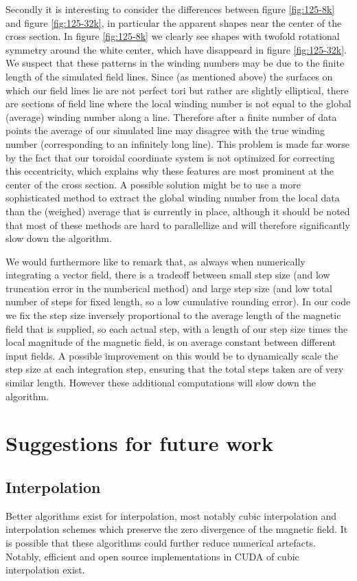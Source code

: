 \documentclass{article}
\begin{document}
Secondly it is interesting to consider the differences between figure \ref{fig:125-8k} and figure \ref{fig:125-32k}, in particular the apparent shapes near the center of the cross section. In figure \ref{fig:125-8k} we clearly see shapes with twofold rotational symmetry around the white center, which have disappeard in figure \ref{fig:125-32k}. We suspect that these patterns in the winding numbers may be due to the finite length of the simulated field lines. Since (as mentioned above) the surfaces on which our field lines lie are not perfect tori but rather are slightly elliptical, there are sections of field line where the local winding number is not equal to the global (average) winding number along a line. Therefore after a finite number of data points the average of our simulated line may disagree with the true winding number (corresponding to an infinitely long line). This problem is made far worse by the fact that our toroidal coordinate system is not optimized for correcting this eccentricity, which explains why these features are most prominent at the center of the cross section. A possible solution might be to use a more sophisticated method to extract the global winding number from the local data than the (weighed) average that is currently in place, although it should be noted that most of these methods are hard to parallellize and will therefore significantly slow down the algorithm.

We would furthermore like to remark that, as always when numerically integrating a vector field, there is a tradeoff between small step size (and low truncation error in the numberical method) and large step size (and low total number of steps for fixed length, so a low cumulative rounding error). In our code we fix the step size inversely proportional to the average length of the magnetic field that is supplied, so each actual step, with a length of our step size times the local magnitude of the magnetic field, is on average constant between different input fields. A possible improvement on this would be to dynamically scale the step size at each integration step, ensuring that the total steps taken are of very similar length. However these additional computations will slow down the algorithm.

\section{Suggestions for future work}

\subsection{Interpolation}
Better algorithms exist for interpolation, most notably cubic interpolation and interpolation schemes which preserve the zero divergence of the magnetic field\cite{McNally01052011}. It is possible that these algorithms could further reduce numerical artefacts. %
Notably, efficient and open source implementations in CUDA of cubic interpolation exist.\cite{Ruijters01012012}
\end{document}
